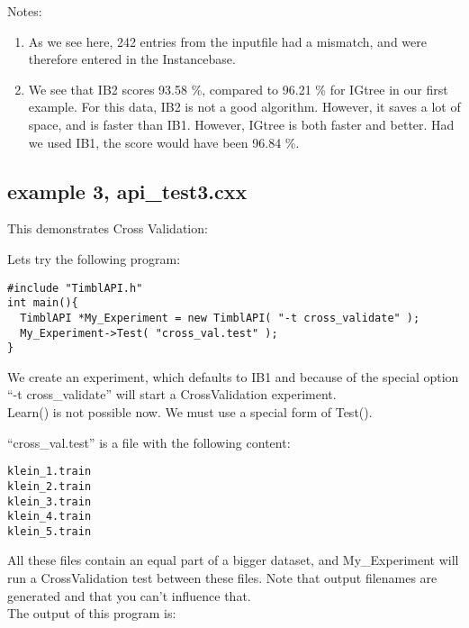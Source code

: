 \documentclass{article}
\begin{document}
Notes:
\begin{enumerate}
\item As we see here, 242 entries from the inputfile had a mismatch,
and were therefore entered in the Instancebase.
\item We see that IB2 scores 93.58 \%, compared to 96.21 \% for IGtree
in our first example. 
For this data, IB2 is not a good algorithm. However, it saves a
lot of space, and is faster than IB1. However, IGtree is both faster and
better. Had we used IB1, the score would have been 96.84 \%.
\end{enumerate}

\subsection{example 3, api\_test3.cxx}
This demonstrates Cross Validation:

Lets try the following program:

\begin{verbatim}
#include "TimblAPI.h"
int main(){
  TimblAPI *My_Experiment = new TimblAPI( "-t cross_validate" );
  My_Experiment->Test( "cross_val.test" );  
}
\end{verbatim}

We create an experiment, which defaults to IB1 and because of the
special option ``-t cross\_validate'' will start a CrossValidation
experiment.\\
Learn() is not possible now. We must use a special form of Test().

``cross\_val.test'' is a file with the following content:
\begin{verbatim}
klein_1.train
klein_2.train
klein_3.train
klein_4.train
klein_5.train
\end{verbatim}

All these files contain an equal part of a bigger dataset, and
My\_Experiment will run a CrossValidation test between these files.
Note that output filenames are generated and that you can't influence
that.\\

The output of this program is:
\end{document}
